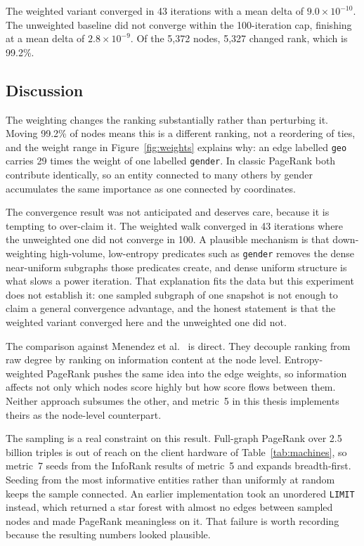 The weighted variant converged in 43 iterations with a mean delta of
$9.0 \times 10^{-10}$. The unweighted baseline did not converge within the
100-iteration cap, finishing at a mean delta of $2.8 \times 10^{-9}$. Of the
5{,}372 nodes, 5{,}327 changed rank, which is 99.2\%.

\subsection{Discussion}

The weighting changes the ranking substantially rather than perturbing it.
Moving 99.2\% of nodes means this is a different ranking, not a reordering of
ties, and the weight range in Figure~\ref{fig:weights} explains why: an edge
labelled \texttt{geo} carries 29 times the weight of one labelled
\texttt{gender}. In classic PageRank both contribute identically, so an entity
connected to many others by gender accumulates the same importance as one
connected by coordinates.

The convergence result was not anticipated and deserves care, because it is
tempting to over-claim it. The weighted walk converged in 43 iterations where the
unweighted one did not converge in 100. A plausible mechanism is that
down-weighting high-volume, low-entropy predicates such as
\texttt{gender} removes the dense near-uniform subgraphs those predicates create,
and dense uniform structure is what slows a power iteration. That explanation
fits the data but this experiment does not establish it: one sampled subgraph of
one snapshot is not enough to claim a general convergence advantage, and the
honest statement is that the weighted variant converged here and the unweighted
one did not.

The comparison against Menendez et al.~\cite{menendez2018ranking} is
direct. They decouple ranking from raw degree by ranking on information content
at the node level. Entropy-weighted PageRank pushes the same idea into the edge
weights, so information affects not only which nodes score highly but how score
flows between them. Neither approach subsumes the other, and metric~5 in this
thesis implements theirs as the node-level counterpart.

The sampling is a real constraint on this result. Full-graph PageRank over 2.5
billion triples is out of reach on the client hardware of
Table~\ref{tab:machines}, so metric~7 seeds from the InfoRank results of metric~5
and expands breadth-first. Seeding from the most informative entities rather than
uniformly at random keeps the sample connected. An earlier implementation took
an unordered \texttt{LIMIT} instead, which returned a star forest with almost no
edges between sampled nodes and made PageRank meaningless on it. That failure is
worth recording because the resulting numbers looked plausible.

